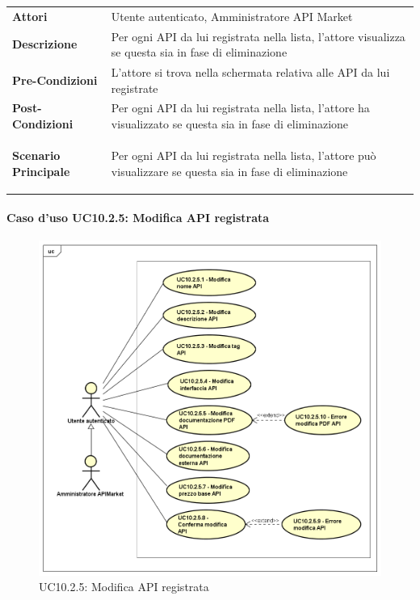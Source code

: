 \begin{minipage}{\linewidth}
	\begin{tabular}{ l | p{11cm}}
		\hline
		\rowcolor{Gray}
		\multicolumn{2}{c}{UC10.2.1 - Notifica eliminazione API} \\
		\hline
		\textbf{Attori} & Utente autenticato, Amministratore API Market \\
		\textbf{Descrizione} & Per ogni API da lui registrata nella lista, l'attore visualizza se questa sia in fase di eliminazione \\
		\textbf{Pre-Condizioni} & L'attore si trova nella schermata relativa alle API da lui registrate \\
		\textbf{Post-Condizioni} & Per ogni API da lui registrata nella lista, l'attore ha visualizzato se questa sia in fase di eliminazione \\
		\textbf{Scenario Principale} & 
		\begin{enumerate*}[label=(\arabic*.),itemjoin={\newline}]
			\item Per ogni API da lui registrata nella lista, l'attore può visualizzare se questa sia in fase di eliminazione
		\end{enumerate*}\\
	\end{tabular}
\end{minipage}

\newpage
\paragraph{Caso d'uso UC10.2.5: Modifica API registrata}
\label{UC10_2_5}
\begin{figure}[ht]
	\centering
	\includegraphics[scale=0.45]{UML/UC10_2_5.png}
	\caption{UC10.2.5: Modifica API registrata}
\end{figure}

